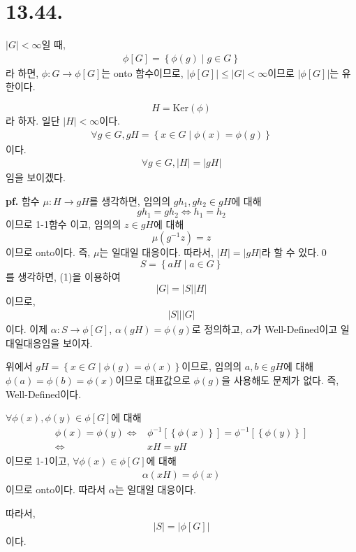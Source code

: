 \documentclass{article}
\begin{document}
\section{13.44.}
$\left|G\right| < \infty$일 때,
\begin{align*}
\phi[G] = \left\{\phi(g) \mid g \in G \right\}
\end{align*}라 하면, $\phi : G \rightarrow \phi[G]$는 onto 함수이므로,  $\left|\phi[G]\right| \le \left|G\right| < \infty$이므로 $\left|\phi[G]\right|$는 유한이다. 

$$H = \text{Ker}(\phi)$$
라 하자. 일단 $\left|H\right| < \infty$이다.
\begin{align*}
\forall g \in G, gH = \left\{x \in G \mid \phi(x) = \phi(g) \right\}
\end{align*}이다.
\begin{align*}
\forall g \in G, \left|H\right| = \left|gH\right| \tag{1}
\end{align*}
임을 보이겠다.

\textbf{pf.} 함수 $\mu : H \rightarrow gH$를 생각하면, 임의의 $gh_1 , gh_2 \in gH$에 대해
$$gh_1 = gh_2 \iff h_1 = h_2$$이므로 1-1함수 이고, 임의의 $z \in gH$에 대해
$$\mu(g^{-1}z) = z$$이므로 onto이다. 즉, $\mu$는 일대일 대응이다. 따라서, $\left|H\right| = \left|gH\right|$라 할 수 있다.\qed
$$S = \left\{aH \mid a \in G \right\}$$
를 생각하면, (1)을 이용하여 
$$ \left|G\right| = \left|S\right| \left|H\right| $$
이므로,
\begin{align*}
\left|S\right| \bigg| \left|G\right| \tag{2}
\end{align*}
이다. 이제 $\alpha : S \rightarrow \phi[G]$, $\alpha(gH) = \phi(g)$로 정의하고, $\alpha$가 Well-Defined이고 일대일대응임을 보이자.

위에서 $gH = \left\{x \in G \mid \phi(g) = \phi(x) \right\}$이므로, 임의의 $a, b \in gH$에 대해 $\phi(a) = \phi(b) = \phi(x)$이므로 대표값으로 $\phi(g)$을 사용해도 문제가 없다. 즉, Well-Defined이다.

$\forall \phi(x), \phi(y) \in \phi[G]$에 대해
\begin{align*}
\phi(x) = \phi(y) \iff& \phi^{-1}[\left\{ \phi(x)\right\}] = \phi^{-1}[\left\{\phi(y)\right\}]
\\ \iff& xH = yH
\end{align*}이므로 1-1이고, $\forall \phi(x) \in \phi[G]$에 대해
\begin{align*}
\alpha(xH) = \phi(x)
\end{align*}이므로 onto이다. 따라서 $\alpha$는 일대일 대응이다.

따라서, 
\begin{align*}
\left|S\right| = \left|\phi[G] \right| \tag{3}
\end{align*}이다.
\end{document}
